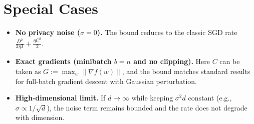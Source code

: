 \documentclass{article}
\begin{document}
\section*{Special Cases}
\begin{itemize}
\item \textbf{No privacy noise ($\sigma=0$).} The bound reduces to the classic SGD rate $\frac{D^2}{2\eta T}+\frac{\eta C^2}{2}$.
\item \textbf{Exact gradients (minibatch $b=n$ and no clipping).} Here $C$ can be taken as $G:=\max_w\|\nabla f(w)\|$, and the bound matches standard results for full‑batch gradient descent with Gaussian perturbation.
\item \textbf{High‑dimensional limit.} If $d\to\infty$ while keeping $\sigma^2 d$ constant (e.g., $\sigma\propto 1/\sqrt{d}$), the noise term remains bounded and the rate does not degrade with dimension.
\end{itemize}
\end{document}
